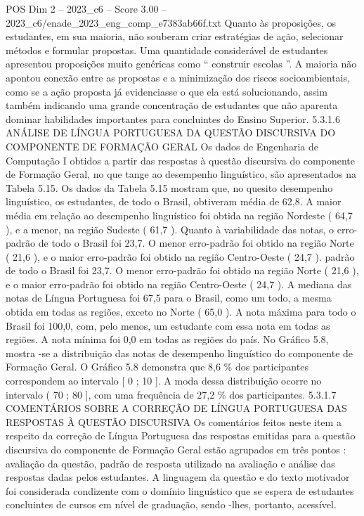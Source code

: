 \begin{textsample}{POS Dim 2 – 2023\_c6 – Score 3.00 – 2023\_c6/enade\_2023\_eng\_comp\_e7383ab66f.txt}
Quanto às proposições, os estudantes, em sua maioria, não souberam criar estratégias de ação, selecionar métodos e formular propostas.
Uma quantidade considerável de estudantes apresentou proposições muito genéricas como “ construir escolas ”.
A maioria não apontou conexão entre as propostas e a minimização dos riscos socioambientais, como se a ação proposta já evidenciasse o que ela está solucionando, assim também indicando uma grande concentração de estudantes que não aparenta dominar habilidades importantes para concluintes do Ensino Superior. 5.3.1.6 ANÁLISE DE LÍNGUA PORTUGUESA DA QUESTÃO DISCURSIVA DO COMPONENTE DE FORMAÇÃO GERAL Os dados de Engenharia de Computação I obtidos a partir das respostas à questão discursiva do componente de Formação Geral, no que tange ao desempenho linguístico, são apresentados na Tabela 5.15.
Os dados da Tabela 5.15 mostram que, no quesito desempenho linguístico, os estudantes, de todo o Brasil, obtiveram média de 62,8.
A maior média em relação ao desempenho linguístico foi obtida na região Nordeste ( 64,7 ), e a menor, na região Sudeste ( 61,7 ).
Quanto à variabilidade das notas, o erro-padrão de todo o Brasil foi 23,7.
O menor erro-padrão foi obtido na região Norte ( 21,6 ), e o maior erro-padrão foi obtido na região Centro-Oeste ( 24,7 ). padrão de todo o Brasil foi 23,7.
O menor erro-padrão foi obtido na região Norte ( 21,6 ), e o maior erro-padrão foi obtido na região Centro-Oeste ( 24,7 ).
A mediana das notas de Língua Portuguesa foi 67,5 para o Brasil, como um todo, a mesma obtida em todas as regiões, exceto no Norte ( 65,0 ).
A nota máxima para todo o Brasil foi 100,0, com, pelo menos, um estudante com essa nota em todas as regiões.
A nota mínima foi 0,0 em todas as regiões do país.
No Gráfico 5.8, mostra -se a distribuição das notas de desempenho linguístico do componente de Formação Geral.
O Gráfico 5.8 demonstra que 8,6 \% dos participantes correspondem ao intervalo [ 0 ; 10 ].
A moda dessa distribuição ocorre no intervalo ( 70 ; 80 ], com uma frequência de 27,2 \% dos participantes. 5.3.1.7 COMENTÁRIOS SOBRE A CORREÇÃO DE LÍNGUA PORTUGUESA DAS RESPOSTAS À QUESTÃO DISCURSIVA Os comentários feitos neste item a respeito da correção de Língua Portuguesa das respostas emitidas para a questão discursiva do componente de Formação Geral estão agrupados em três pontos : avaliação da questão, padrão de resposta utilizado na avaliação e análise das respostas dadas pelos estudantes.
A linguagem da questão e do texto motivador foi considerada condizente com o domínio linguístico que se espera de estudantes concluintes de cursos em nível de graduação, sendo -lhes, portanto, acessível.

\end{textsample}
